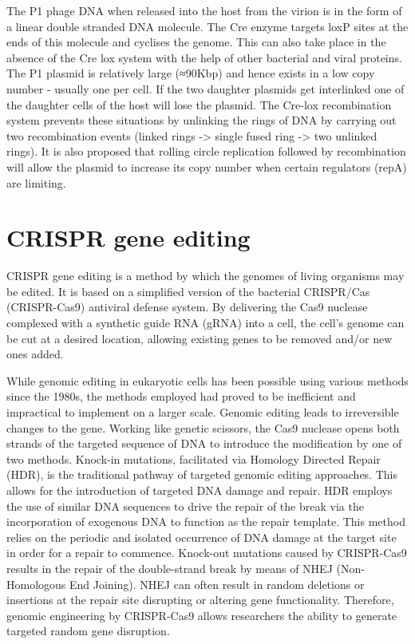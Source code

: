 The P1 phage DNA when released into the host from the virion is in the form of a linear double stranded DNA molecule. The Cre enzyme targets loxP sites at the ends of this molecule and cyclises the genome. This can also take place in the absence of the Cre lox system with the help of other bacterial and viral proteins. The P1 plasmid is relatively large (≈90Kbp) and hence exists in a low copy number - usually one per cell. If the two daughter plasmids get interlinked one of the daughter cells of the host will lose the plasmid. The Cre-lox recombination system prevents these situations by unlinking the rings of DNA by carrying out two recombination events (linked rings -\textgreater{} single fused ring -\textgreater{} two unlinked rings). It is also proposed that rolling circle replication followed by recombination will allow the plasmid to increase its copy number when certain regulators (repA) are limiting.

\hypertarget{crispr-gene-editing}{%
\section{CRISPR gene editing}\label{crispr-gene-editing}}

CRISPR gene editing is a method by which the genomes of living organisms may be edited. It is based on a simplified version of the bacterial CRISPR/Cas (CRISPR-Cas9) antiviral defense system. By delivering the Cas9 nuclease complexed with a synthetic guide RNA (gRNA) into a cell, the cell's genome can be cut at a desired location, allowing existing genes to be removed and/or new ones added.

While genomic editing in eukaryotic cells has been possible using various methods since the 1980s, the methods employed had proved to be inefficient and impractical to implement on a larger scale. Genomic editing leads to irreversible changes to the gene. Working like genetic scissors, the Cas9 nuclease opens both strands of the targeted sequence of DNA to introduce the modification by one of two methods. Knock-in mutations, facilitated via Homology Directed Repair (HDR), is the traditional pathway of targeted genomic editing approaches. This allows for the introduction of targeted DNA damage and repair. HDR employs the use of similar DNA sequences to drive the repair of the break via the incorporation of exogenous DNA to function as the repair template. This method relies on the periodic and isolated occurrence of DNA damage at the target site in order for a repair to commence. Knock-out mutations caused by CRISPR-Cas9 results in the repair of the double-strand break by means of NHEJ (Non-Homologous End Joining). NHEJ can often result in random deletions or insertions at the repair site disrupting or altering gene functionality. Therefore, genomic engineering by CRISPR-Cas9 allows researchers the ability to generate targeted random gene disruption.

